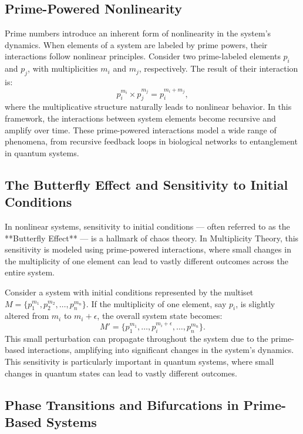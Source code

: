 \documentclass[%
 preprint, linenumbers,
 amsmath,amssymb,
 aps, physrev,
]{revtex4-2}
\begin{document}
\subsection{Prime-Powered Nonlinearity}

Prime numbers introduce an inherent form of nonlinearity in the system's dynamics. When elements of a system are labeled by prime powers, their interactions follow nonlinear principles. Consider two prime-labeled elements \( p_i \) and \( p_j \), with multiplicities \( m_i \) and \( m_j \), respectively. The result of their interaction is:
\[
p_i^{m_i} \times p_j^{m_j} = p_i^{m_i + m_j},
\]
where the multiplicative structure naturally leads to nonlinear behavior. In this framework, the interactions between system elements become recursive and amplify over time. These prime-powered interactions model a wide range of phenomena, from recursive feedback loops in biological networks to entanglement in quantum systems.

\subsection{The Butterfly Effect and Sensitivity to Initial Conditions}

In nonlinear systems, sensitivity to initial conditions — often referred to as the **Butterfly Effect** — is a hallmark of chaos theory. In Multiplicity Theory, this sensitivity is modeled using prime-powered interactions, where small changes in the multiplicity of one element can lead to vastly different outcomes across the entire system. 

Consider a system with initial conditions represented by the multiset \( M = \{p_1^{m_1}, p_2^{m_2}, \dots, p_n^{m_n}\} \). If the multiplicity of one element, say \( p_i \), is slightly altered from \( m_i \) to \( m_i + \epsilon \), the overall system state becomes:
\[
M' = \{p_1^{m_1}, \dots, p_i^{m_i + \epsilon}, \dots, p_n^{m_n}\}.
\]
This small perturbation can propagate throughout the system due to the prime-based interactions, amplifying into significant changes in the system's dynamics. This sensitivity is particularly important in quantum systems, where small changes in quantum states can lead to vastly different outcomes.

\subsection{Phase Transitions and Bifurcations in Prime-Based Systems}
\end{document}
